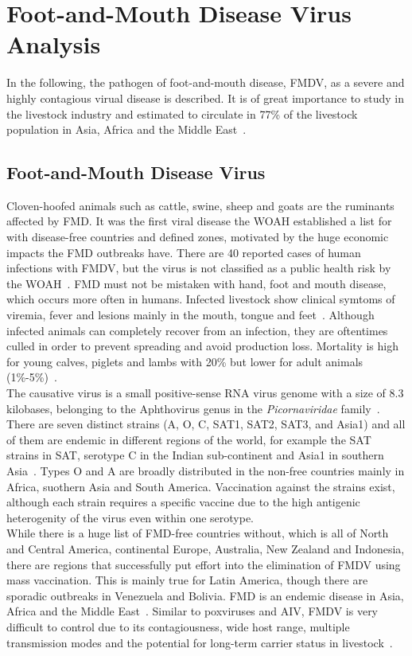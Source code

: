 \section{Foot-and-Mouth Disease Virus Analysis}
In the following, the pathogen of foot-and-mouth disease, \ac{FMDV}, as a severe and highly contagious virual disease is described. It is of great importance to study in the livestock industry and estimated to circulate in 77\% of the livestock population in Asia, Africa and the Middle East~\cite{woah2023fmd}.

\subsection{Foot-and-Mouth Disease Virus}
Cloven-hoofed animals such as cattle, swine, sheep and goats are the ruminants affected by \ac{FMD}. It was the first viral disease the \ac{WOAH} established a list for with disease-free countries and defined zones, motivated by the huge economic impacts the \ac{FMD} outbreaks have. There are 40 reported cases of human infections with \ac{FMDV}, but the virus is not classified as a public health risk by the \ac{WOAH}~\cite{woah2023fmd}. \ac{FMD} must not be mistaken with hand, foot and mouth disease, which occurs more often in humans. Infected livestock show clinical symtoms of viremia, fever and lesions mainly in the mouth, tongue and feet~\cite{domingo1990genetic}. Although infected animals can completely recover from an infection, they are oftentimes culled in order to prevent spreading and avoid production loss. Mortality is high for young calves, piglets and lambs with 20\% but lower for adult animals (1\%-5\%)~\cite{woah2023fmd}. \\
The causative virus is a small positive-sense \ac{RNA} virus genome with a size of 8.3 kilobases, belonging to the Aphthovirus genus in the \textit{Picornaviridae} family~\cite{tax2021virus}. There are seven distinct strains (A, O, C, SAT1, SAT2, SAT3, and Asia1) and all of them are endemic in different regions of the world, for example the SAT strains in \ac{SAT}, serotype C in the Indian sub-continent and Asia1 in southern Asia~\cite{knowles2003molecular}. Types O and A are broadly distributed in the non-free countries mainly in Africa, suothern Asia and South America. Vaccination against the strains exist, although each strain requires a specific vaccine due to the high antigenic heterogenity of the virus even within one serotype. \\
While there is a huge list of FMD-free countries without, which is all of North and Central America, continental Europe, Australia, New Zealand and Indonesia, there are regions that successfully put effort into the elimination of \ac{FMDV} using mass vaccination. This is mainly true for Latin America, though there are sporadic outbreaks in Venezuela and Bolivia. \ac{FMD} is an endemic disease in Asia, Africa and the Middle East~\cite{brito2017review}. Similar to poxviruses and \ac{AIV}, \ac{FMDV} is very difficult to control due to its contagiousness, wide host range, multiple transmission modes and the potential for long-term carrier status in livestock~\cite{firestone2019reconstructing}. \\
